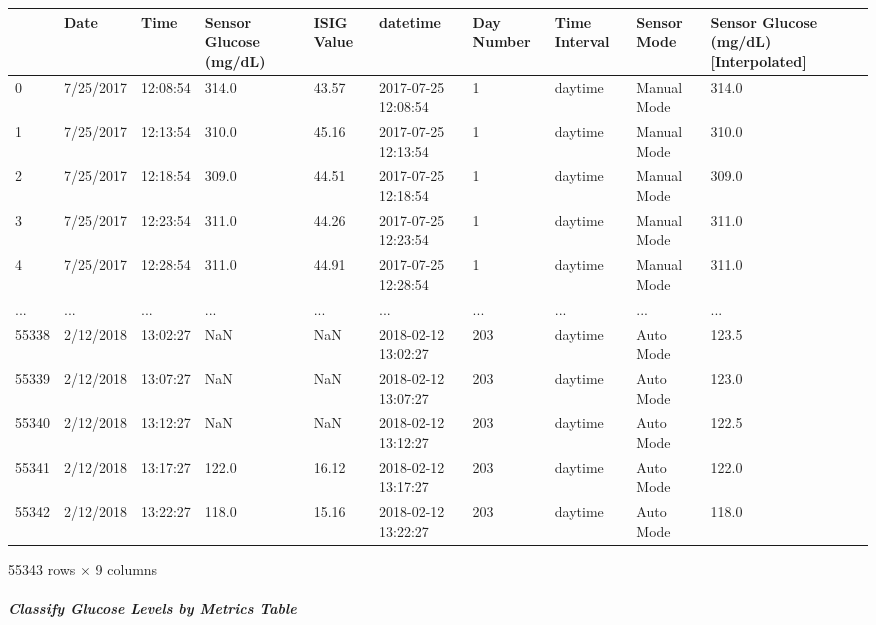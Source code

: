 \bigskip\noindent
\begin{tabular}{p{}p{}p{}p{}p{}p{}p{}p{}p{}p{}}
\toprule
 & Date & Time & Sensor Glucose (mg/dL) & ISIG Value & datetime & Day Number & Time Interval & Sensor Mode & Sensor Glucose (mg/dL) [Interpolated] \\
\hline
0 & 7/25/2017 & 12:08:54 & 314.0 & 43.57 & 2017-07-25 12:08:54 & 1 & daytime & Manual Mode & 314.0 \\
\hline
1 & 7/25/2017 & 12:13:54 & 310.0 & 45.16 & 2017-07-25 12:13:54 & 1 & daytime & Manual Mode & 310.0 \\
\hline
2 & 7/25/2017 & 12:18:54 & 309.0 & 44.51 & 2017-07-25 12:18:54 & 1 & daytime & Manual Mode & 309.0 \\
\hline
3 & 7/25/2017 & 12:23:54 & 311.0 & 44.26 & 2017-07-25 12:23:54 & 1 & daytime & Manual Mode & 311.0 \\
\hline
4 & 7/25/2017 & 12:28:54 & 311.0 & 44.91 & 2017-07-25 12:28:54 & 1 & daytime & Manual Mode & 311.0 \\
\hline
... & ... & ... & ... & ... & ... & ... & ... & ... & ... \\
\hline
55338 & 2/12/2018 & 13:02:27 & NaN & NaN & 2018-02-12 13:02:27 & 203 & daytime & Auto Mode & 123.5 \\
\hline
55339 & 2/12/2018 & 13:07:27 & NaN & NaN & 2018-02-12 13:07:27 & 203 & daytime & Auto Mode & 123.0 \\
\hline
55340 & 2/12/2018 & 13:12:27 & NaN & NaN & 2018-02-12 13:12:27 & 203 & daytime & Auto Mode & 122.5 \\
\hline
55341 & 2/12/2018 & 13:17:27 & 122.0 & 16.12 & 2018-02-12 13:17:27 & 203 & daytime & Auto Mode & 122.0 \\
\hline
55342 & 2/12/2018 & 13:22:27 & 118.0 & 15.16 & 2018-02-12 13:22:27 & 203 & daytime & Auto Mode & 118.0 \\
\hline
\bottomrule
\end{tabular}

\bigskip

55343 rows $\times$ 9 columns

\subparagraph{Classify Glucose Levels by Metrics Table}

